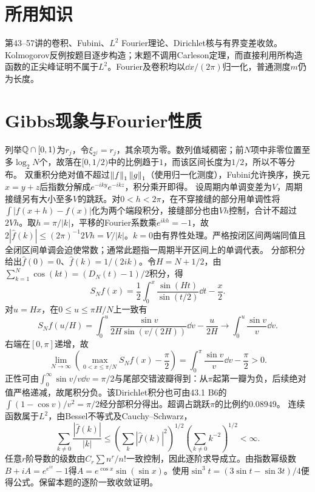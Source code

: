 \documentclass[UTF8,fontset=fandol,11pt]{ctexart}
\begin{document}
\section*{所用知识}
第43--57讲的卷积、Fubini、$L^2$ Fourier理论、Dirichlet核与有界变差收敛。Kolmogorov反例按题目逐步构造；末题不调用Carleson定理，而直接利用所构造函数的正尖峰证明不属于$L^2$。Fourier及卷积均以$\dd x/(2\pi)$归一化，普通测度$m$仍为长度。
\section{Gibbs现象与Fourier性质}
\problem{A1}{构造$[0,1)$中稠密但不等分布的数列。}
列举$\mathbb Q\cap[0,1)$为$r_j$，令$\xi_{2^j}=r_j$，其余项为零。数列值域稠密；前$N$项中非零位置至多$\log_2N$个，故落在$[0,1/2)$中的比例趋于$1$，而该区间长度为$1/2$，所以不等分布。
双重积分绝对值不超过$\left\lVert f\right\rVert_1\left\lVert g\right\rVert_1$（使用归一化测度），Fubini允许换序，换元$x=y+z$后指数分解成$e^{-iky}e^{-ikz}$，积分乘开即得。
设周期内单调变差为$V$，周期接缝另有大小至多$V$的跳跃。对$0<h<2\pi$，在不穿接缝的部分用单调性将$\int|f(x+h)-f(x)|$化为两个端段积分，接缝部分也由$Vh$控制，合计不超过$2Vh$。取$h=\pi/|k|$，平移的Fourier系数乘$e^{ikh}=-1$，故$2|\widehat f(k)|\le(2\pi)^{-1}2Vh=V/|k|$。$k=0$由有界性处理。严格按闭区间两端同值且全闭区间单调会迫使常数；通常此题指一周期半开区间上的单调代表。
分部积分给出$\widehat f(0)=0$、$\widehat f(k)=1/(2ik)$。令$H=N+1/2$，由$\sum_{k=1}^N\cos(kt)=(D_N(t)-1)/2$积分，得
\[S_Nf(x)=\frac12\int_0^x\frac{\sin(Ht)}{\sin(t/2)}\dd t-\frac x2.\]
对$u=Hx$，在$0\le u\le\pi H/N$上一致有
\[S_Nf(u/H)=\int_0^u\frac{\sin v}{2H\sin(v/(2H))}\dd v-\frac u{2H}\longrightarrow\int_0^u\frac{\sin v}{v}\dd v.\]
右端在$[0,\pi]$递增，故
\[\lim_{N\to\infty}\left(\max_{0<x\le\pi/N}S_Nf(x)-\frac\pi2\right)=\int_0^\pi\frac{\sin v}{v}\dd v-\frac\pi2>0.\]
正性可由$\int_0^\infty\sin v/v\dd v=\pi/2$与尾部交错波瓣得到：从$\pi$起第一瓣为负，后续绝对值严格递减，故尾积分负。该Dirichlet积分也可由43.1 B6的$\int(1-\cos v)/v^2=\pi/2$经分部积分得出。超调占跳跃$\pi$的比例约$0.08949$。
连续函数属于$L^2$，由Bessel不等式及Cauchy--Schwarz，
\[\sum_{k\ne0}\frac{|\widehat f(k)|}{|k|}\le\left(\sum_k|\widehat f(k)|^2\right)^{1/2}\left(\sum_{k\ne0}k^{-2}\right)^{1/2}<\infty.\]
任意$r$阶导数的级数由$C_r\sum n^r/n!$一致控制，因此逐阶求导成立。由指数幂级数$B+iA=e^{e^{ix}}-1$得$A=e^{\cos x}\sin(\sin x)$。使用$\sin^3t=(3\sin t-\sin3t)/4$便得公式。保留本题的逐阶一致收敛证明。

\end{document}
